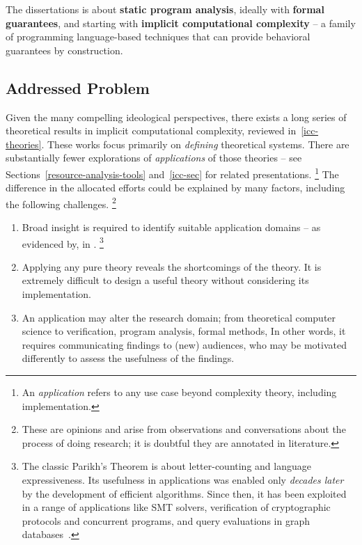 \begin{mdframed}[backgroundcolor=conceptbase,linecolor=concept,nobreak=true]
The dissertations is about \textbf{static program analysis}, ideally with
\textbf{formal guarantees}, and starting with \textbf{implicit computational
complexity} -- a family of programming language-based techniques that can
provide behavioral guarantees by construction.
\end{mdframed}

\subsection{Addressed Problem}
\label{subsec:problem}

Given the many compelling ideological perspectives, there exists a long series of theoretical results in implicit computational complexity, reviewed in~\autoref{icc-theories}.
These works focus primarily on \emph{defining} theoretical systems.
There are substantially fewer explorations of \emph{applications} of those theories -- see Sections~\ref{resource-analysis-tools} and~\ref{icc-sec} for related presentations.%
\footnote{An \emph{application} refers to any use case beyond complexity theory, including implementation.}
The difference in the allocated efforts could be explained by many factors, including the following challenges.%
\footnote{These are opinions and arise from observations and conversations about the process of doing research; it is doubtful they are annotated in literature.}

\begin{enumerate}

\item Broad insight is required to identify suitable application domains -- as
      evidenced by, \eg {} in .%
      \footnote{The classic Parikh's Theorem is about letter-counting and language expressiveness.
      Its usefulness in applications was enabled only \emph{decades later} by the development of efficient algorithms.
      Since then,  it has been exploited in a range of applications like SMT solvers, verification of cryptographic protocols and concurrent programs, and query evaluations in graph databases~\cite[pg. 2]{hague2024}.}

\item Applying any pure theory reveals the shortcomings of the theory.
      It is extremely difficult to design a useful theory without considering its implementation.

\item An application may alter the research domain; \eg from theoretical computer science to verification, program analysis, formal methods, \etc
      In other words, it requires communicating findings to (new) audiences, who may be motivated differently to assess the usefulness of the findings.

\end{enumerate}

